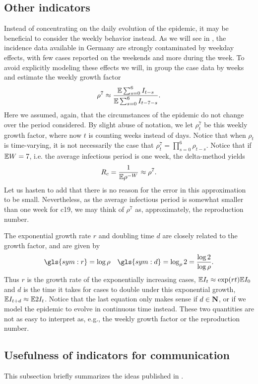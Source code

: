 \subsection{Other indicators}
\label{subsec:other_indicat}
Instead of concentrating on the daily evolution of the epidemic, it may be beneficial to consider the weekly behavior instead. As we will see in , the incidence data available in Germany are strongly contaminated by weekday effects, with few cases reported on the weekends and more during the week. To avoid explicitly modeling these effects we will, in  group the case data by weeks and estimate the weekly growth factor
\begin{align}
    \label{eq:rho7_smooth}
    \rho^{7} \approx \frac{ \mathbb E \sum_{s = 0}^{6} I_{t - s}}{\mathbb E \sum_{s = 0}^6 I_{t - 7 - s}}.
\end{align}
Here we assumed, again, that the circumstances of the epidemic do not change over the period considered. By slight abuse of notation, we let $\rho^{7}_t$ be this weekly growth factor, where now $t$ is counting weeks instead of days. Notice that when $\rho_{t}$ is time-varying, it is not necessarily the case that $\rho^{7}_t = \prod_{s = 0}^{6} \rho_{t - s}$. Notice that if $\mathbb E W = 7$, i.e. the average infectious period is one week, the delta-method yields 
$$
    R_{c} = \frac{1}{\mathbb E \rho^{-W}} \approx \rho^{7}.
$$
Let us hasten to add that there is no reason for the error in this approximation to be small. Nevertheless, as the average infectious period is somewhat smaller than one week for \acrshort{c19}, we may think of $\rho^{7}$ as, approximately, the reproduction number.

The exponential growth rate $r$ and doubling time $d$ are closely related to the growth factor, and are given by 
\begin{align*}
    \gls{sym:r} = \log \rho && \gls{sym:d} = \log_{\rho} 2 = \frac{\log 2}{\log \rho}.
\end{align*}
Thus $r$ is the growth rate of the exponentially increasing cases, $\mathbb E I_{t} \approx \exp(rt) \mathbb E I_{0}$ and $d$ is the time it takes for cases to double under this exponential growth, $\mathbb E I_{t + d} \approx \mathbb E 2I_{t}$. Notice that the last equation only makes sense if $d \in \mathbf N$, or if we model the epidemic to evolve in continuous time instead. These two quantities are not as easy to interpret as, e.g., the weekly growth factor or the reproduction number. 

\subsection{Usefulness of indicators for communication}
\label{subsec:usefulness_of_indicators}
This subsection briefly summarizes the ideas published in \citep{Heyder2023Measures}.

